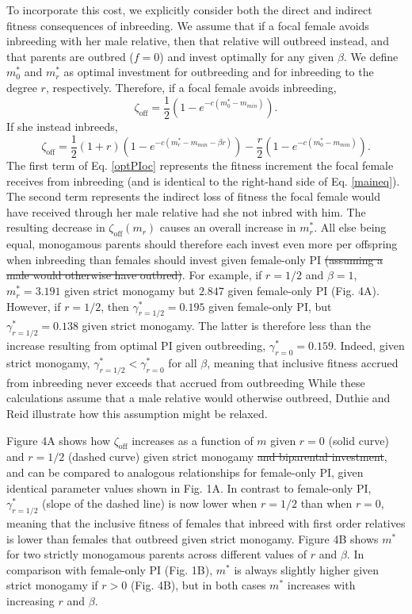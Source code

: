 \documentclass[12pt]{article}
\begin{document}
To incorporate this cost, we explicitly consider both the direct and indirect fitness consequences of inbreeding. We assume that if a focal female avoids inbreeding with her male relative, then that relative will outbreed instead, and that parents are outbred ($f=0$) and invest optimally for any given $\beta$. We define $m^{*}_{0}$ and $m^{*}_{r}$ as optimal investment for outbreeding and for inbreeding to the degree $r$, respectively. Therefore, if a focal female avoids inbreeding,
\begin{equation} \label{optPI}
\zeta_{\textrm{off}} = \frac{1}{2}\left(1-e^{-c\left(m^{*}_{0}-m_{min}\right)}\right).
\end{equation}
If she instead inbreeds,
\begin{equation} \label{optPIoc}
\zeta_{\textrm{off}} = \frac{1}{2}\left(1+r\right)\left(1-e^{-c\left(m^{*}_{r}-m_{min}-\beta r\right)}\right) - \frac{r}{2}\left(1-e^{-c\left(m^{*}_{0}-m_{min}\right)}\right).
\end{equation} 
The first term of Eq. \ref{optPIoc} represents the fitness increment the focal female receives from inbreeding (and is identical to the right-hand side of Eq. \ref{maineq}). The second term represents the indirect loss of fitness the focal female would have received through her male relative had she not inbred with him. The resulting decrease in $\zeta_{\textrm{off}}(m_{r})$ causes an overall increase in $m^{*}_{r}$. All else being equal, monogamous parents should therefore each invest even more per offspring when inbreeding than females should invest given female-only PI {\color{red}\st{(assuming a male would otherwise have outbred)}}. For example, if $r=1/2$ and $\beta=1$, $m^{*}_{r}= 3.191$ given strict monogamy but $2.847$ given female-only PI (Fig. 4A).  However, if $r=1/2$, then $\gamma^{*}_{r=1/2}=0.195$ given female-only PI, but $\gamma^{*}_{r=1/2}=0.138$ given strict monogamy. The latter is therefore less than the increase resulting from optimal PI given outbreeding, $\gamma^{*}_{r=0}=0.159$. Indeed, given strict monogamy, $\gamma^{*}_{r=1/2} < \gamma^{*}_{r=0}$ for all $\beta$, meaning that inclusive fitness accrued from inbreeding never exceeds that accrued from outbreeding {\color{blue} While these calculations assume that a male relative would otherwise outbreed, Duthie and Reid \cite{Duthie2015a} illustrate how this assumption might be relaxed.} 

Figure 4A shows how $\zeta_{\textrm{off}}$ increases as a function of $m$ given $r=0$ (solid curve) and $r=1/2$ (dashed curve) given strict monogamy {\color{red}\st{and biparental investment}}, and can be compared to analogous relationships for female-only PI, given identical parameter values shown in Fig. 1A. In contrast to female-only PI, $\gamma^{*}_{r=1/2}$ (slope of the dashed line) is now lower when $r=1/2$ than when $r=0$, meaning that the inclusive fitness of females that inbreed with first order relatives is lower than females that outbreed given strict monogamy. Figure 4B shows $m^{*}$ for two strictly monogamous parents across different values of $r$ and $\beta$. In comparison with female-only PI (Fig. 1B), $m^{*}$ is always slightly higher given strict monogamy if $r>0$ (Fig. 4B), but in both cases $m^{*}$ increases with increasing $r$ and $\beta$. 
\end{document}
